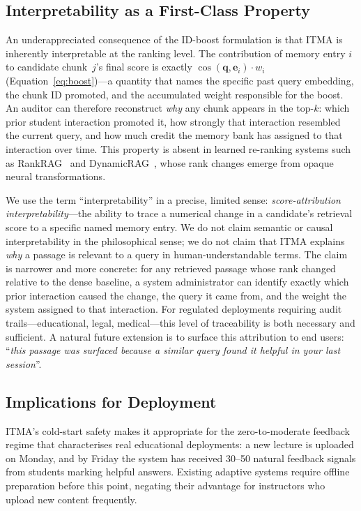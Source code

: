 \documentclass[journal]{IEEEtran}
\begin{document}
\subsection{Interpretability as a First-Class Property}
An underappreciated consequence of the ID-boost formulation is that
ITMA is inherently interpretable at the ranking level.  The
contribution of memory entry $i$ to candidate chunk~$j$'s final score
is exactly $\cos(\mathbf{q},\mathbf{e}_i)\cdot w_i$
(Equation~\ref{eq:boost})---a quantity that names the specific past
query embedding, the chunk ID promoted, and the accumulated weight
responsible for the boost.  An auditor can therefore reconstruct
\emph{why} any chunk appears in the top-$k$: which prior student
interaction promoted it, how strongly that interaction resembled the
current query, and how much credit the memory bank has assigned to
that interaction over time.  This property is absent in learned
re-ranking systems such as RankRAG~\cite{rankrag2024} and
DynamicRAG~\cite{dynamicrag2024}, whose rank changes emerge from
opaque neural transformations.

We use the term ``interpretability'' in a precise, limited sense:
\emph{score-attribution interpretability}---the ability to trace a
numerical change in a candidate's retrieval score to a specific named
memory entry.  We do not claim semantic or causal interpretability in
the philosophical sense; we do not claim that ITMA explains \emph{why}
a passage is relevant to a query in human-understandable terms.  The
claim is narrower and more concrete: for any retrieved passage whose
rank changed relative to the dense baseline, a system administrator
can identify exactly which prior interaction caused the change, the
query it came from, and the weight the system assigned to that
interaction.  For regulated deployments requiring audit
trails---educational, legal, medical---this level of traceability is
both necessary and sufficient.  A natural future extension is to
surface this attribution to end users: ``\emph{this passage was
surfaced because a similar query found it helpful in your last
session}''.

\subsection{Implications for Deployment}
ITMA's cold-start safety makes it appropriate for the zero-to-moderate
feedback regime that characterises real educational deployments: a new
lecture is uploaded on Monday, and by Friday the system has received
30--50 natural feedback signals from students marking helpful answers.
Existing adaptive systems require offline preparation before this
point, negating their advantage for instructors who upload new content
frequently.
\end{document}

